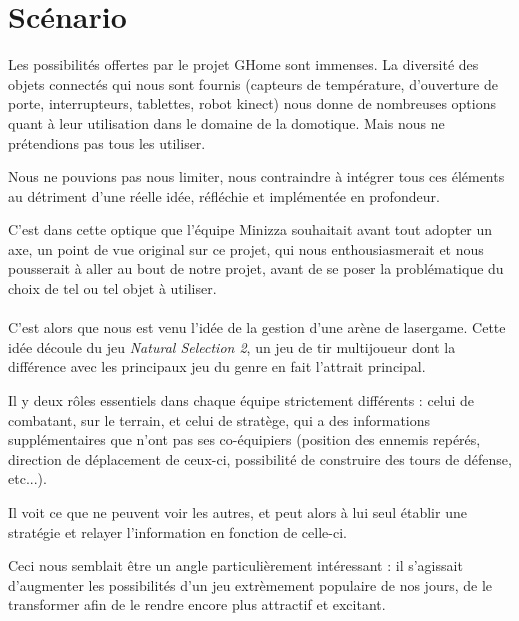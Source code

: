 \section{Scénario}

Les possibilités offertes par le projet GHome sont immenses. La diversité des objets connectés qui nous sont fournis (capteurs de température, d'ouverture de porte, interrupteurs, tablettes, robot kinect) nous donne de nombreuses options quant à leur utilisation dans le domaine de la domotique. Mais nous ne prétendions pas tous les utiliser. 

Nous ne pouvions pas nous limiter, nous contraindre à intégrer tous ces éléments au détriment d'une réelle idée, réfléchie et implémentée en profondeur. 

C'est dans cette optique que l'équipe Minizza souhaitait avant tout adopter un axe, un point de vue original sur ce projet, qui nous enthousiasmerait et nous pousserait à aller au bout de notre projet, avant de se poser la problématique du choix de tel ou tel objet à utiliser.

\paragraph{}

C'est alors que nous est venu l'idée de la gestion d'une arène de lasergame. Cette idée découle du jeu \textit{Natural Selection 2}, un jeu de tir multijoueur dont la différence avec les principaux jeu du genre en fait l'attrait principal. 

Il y deux rôles essentiels dans chaque équipe strictement différents : celui de combatant, sur le terrain, et celui de stratège, qui a des informations supplémentaires que n'ont pas ses co-équipiers (position des ennemis repérés, direction de déplacement de ceux-ci, possibilité de construire des tours de défense, etc...). 

Il voit ce que ne peuvent voir les autres, et peut alors à lui seul établir une stratégie et relayer l'information en fonction de celle-ci.

Ceci nous semblait être un angle particulièrement intéressant : il s'agissait d'augmenter les possibilités d'un jeu extrèmement populaire de nos jours, de le transformer afin de le rendre encore plus attractif et excitant.

\paragraph{}

